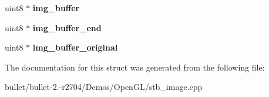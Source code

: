 \begin{DoxyCompactItemize}
\item 
\hypertarget{structstbi_aace36d5487a596bea5faa0aef0398ac8}{uint8 $\ast$ {\bfseries img\+\_\+buffer}}\label{structstbi_aace36d5487a596bea5faa0aef0398ac8}

\item 
\hypertarget{structstbi_a55f78565e605f1784d47fc9acea475f3}{uint8 $\ast$ {\bfseries img\+\_\+buffer\+\_\+end}}\label{structstbi_a55f78565e605f1784d47fc9acea475f3}

\item 
\hypertarget{structstbi_a261be6edda817862e623972b21b4f965}{uint8 $\ast$ {\bfseries img\+\_\+buffer\+\_\+original}}\label{structstbi_a261be6edda817862e623972b21b4f965}

\end{DoxyCompactItemize}


The documentation for this struct was generated from the following file\+:\begin{DoxyCompactItemize}
\item 
bullet/bullet-\/2.-\/r2704/\+Demos/\+Open\+G\+L/stb\+\_\+image.\+cpp\end{DoxyCompactItemize}
